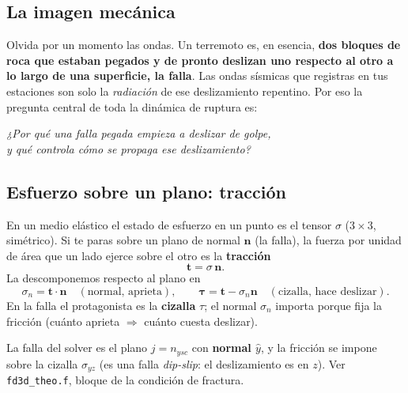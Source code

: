 \documentclass[11pt,a4paper]{article}
\newcommand{\vv}[1]{\mathbf{#1}}
\begin{document}
\subsection{La imagen mecánica}
Olvida por un momento las ondas. Un terremoto es, en esencia, \textbf{dos bloques
de roca que estaban pegados y de pronto deslizan uno respecto al otro a lo largo
de una superficie, la falla}. Las ondas sísmicas que registras en tus estaciones
son solo la \emph{radiación} de ese deslizamiento repentino. Por eso la pregunta
central de toda la dinámica de ruptura es:
\begin{center}
\itshape ¿Por qué una falla pegada empieza a deslizar de golpe,\\
y qué controla cómo se propaga ese deslizamiento?
\end{center}

\subsection{Esfuerzo sobre un plano: tracción}
En un medio elástico el estado de esfuerzo en un punto es el tensor $\sigma$
($3\times3$, simétrico). Si te paras sobre un plano de normal $\vv{n}$ (la falla),
la fuerza por unidad de área que un lado ejerce sobre el otro es la
\textbf{tracción}
\begin{equation}
  \vv{t} = \sigma\,\vv{n}.
\end{equation}
La descomponemos respecto al plano en
\begin{equation}
  \sigma_n = \vv{t}\cdot\vv{n}\quad(\text{normal, aprieta}),
  \qquad
  \vv{\tau} = \vv{t} - \sigma_n\vv{n}\quad(\text{cizalla, hace deslizar}).
\end{equation}
En la falla el protagonista es la \textbf{cizalla} $\tau$; el normal $\sigma_n$
importa porque fija la fricción (cuánto aprieta $\Rightarrow$ cuánto cuesta
deslizar).

\begin{codebox}
La falla del solver es el plano $j=n_{ysc}$ con \textbf{normal $\hat y$}, y la
fricción se impone sobre la cizalla $\sigma_{yz}$ (es una falla \emph{dip-slip}:
el deslizamiento es en $z$). Ver \texttt{fd3d\_theo.f}, bloque de la condición de
fractura.
\end{codebox}
\end{document}
